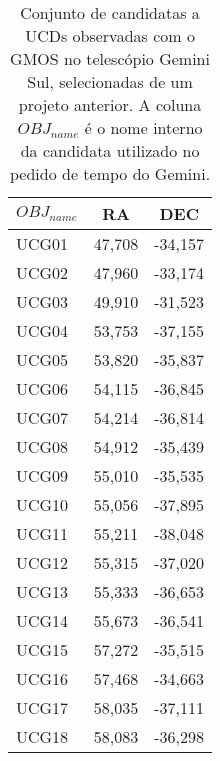 \begin{table}[!ht]
    \centering
    \caption{Conjunto de candidatas a UCDs observadas com o GMOS no telescópio Gemini Sul, selecionadas de um projeto anterior. A coluna $OBJ_{name}$ é o nome interno da candidata utilizado no pedido de tempo do Gemini.} 
    \begin{tabular}{lcc}
        \toprule
        $OBJ_{name}$ & RA     & DEC     \\
        \midrule
        UCG01     & 47,708 & -34,157 \\
        UCG02     & 47,960 & -33,174 \\
        UCG03     & 49,910 & -31,523 \\
        UCG04     & 53,753 & -37,155 \\
        UCG05     & 53,820 & -35,837 \\
        UCG06     & 54,115 & -36,845 \\
        UCG07     & 54,214 & -36,814 \\
        UCG08     & 54,912 & -35,439 \\
        UCG09     & 55,010 & -35,535 \\
        UCG10     & 55,056 & -37,895 \\
        UCG11     & 55,211 & -38,048 \\
        UCG12     & 55,315 & -37,020 \\
        UCG13     & 55,333 & -36,653 \\
        UCG14     & 55,673 & -36,541 \\
        UCG15     & 57,272 & -35,515 \\
        UCG16     & 57,468 & -34,663 \\
        UCG17     & 58,035 & -37,111 \\
        UCG18     & 58,083 & -36,298 \\
        \bottomrule
    \end{tabular}
    \label{candidatas_espectroscopia_1}
\end{table}


